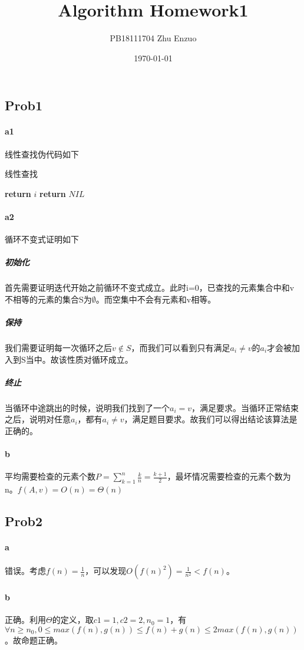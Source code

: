 \documentclass{ctexart}
\title{Algorithm Homework1}
\author{PB18111704 Zhu Enzuo}
\date{\today}
\begin{document}
\maketitle

\subsection{Prob1}
\paragraph{a1}线性查找伪代码如下
\begin{algorithm}
    \caption{线性查找}\label{euclid}
    \begin{algorithmic}[1]
            \State \textbf{return} $i$
        \EndIf
    \EndFor
    \State \textbf{return} $NIL$
    \EndProcedure
    \end{algorithmic}
\end{algorithm}
\paragraph{a2}循环不变式证明如下
\subparagraph{初始化} 首先需要证明迭代开始之前循环不变式成立。此时i=0，已查找的元素集合中和v不相等的元素的集合S为$\emptyset$。而空集中不会有元素和v相等。
\subparagraph{保持} 我们需要证明每一次循环之后$v\notin S$，而我们可以看到只有满足$a_i\not= v$的$a_i$才会被加入到S当中。故该性质对循环成立。
\subparagraph{终止} 当循环中途跳出的时候，说明我们找到了一个$a_i=v$，满足要求。当循环正常结束之后，说明对任意$a_i$，都有$a_i\not=v$，满足题目要求。故我们可以得出结论该算法是正确的。

\paragraph{b}平均需要检查的元素个数$P=\sum_{k=1}^n \frac{k}{n} =\frac{k+1}{2}$，最坏情况需要检查的元素个数为n。$f(A,v)=O(n)=\Theta (n)$

\subsection{Prob2}
\paragraph{a} 错误。考虑$f(n)=\frac{1}{n}$，可以发现$O(f(n)^2)=\frac{1}{n^2}<f(n)$。
\paragraph{b} 正确。利用$\Theta$的定义，取$c1=1, c2=2, n_0=1$，有$\forall n\ge n_0, 0\leq max(f(n),g(n))\leq f(n)+g(n)\leq 2max(f(n),g(n))$。故命题正确。
\end{document}
